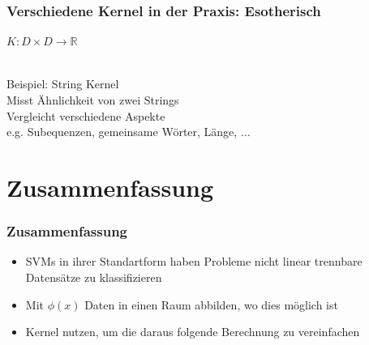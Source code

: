 	\begin{frame}
		\frametitle{Verschiedene Kernel in der Praxis: Esotherisch}
			$K: D \times D \rightarrow \mathbb{R}$ \\\
			
			Beispiel: String Kernel \\
			\hspace{31pt} Misst Ähnlichkeit von zwei Strings \\
			\hspace{31pt} Vergleicht verschiedene Aspekte \\
			\hspace{62pt} e.g. Subequenzen, gemeinsame Wörter, Länge, $\dots$
	\end{frame}
	
\section{Zusammenfassung}
	\begin{frame}
		\frametitle{Zusammenfassung}
			\begin{itemize}
				\item SVMs in ihrer Standartform haben Probleme nicht linear trennbare Datensätze zu klassifizieren
				\item Mit $\phi(x)$ Daten in einen Raum abbilden, wo dies möglich ist
				\item Kernel nutzen, um die daraus folgende Berechnung zu vereinfachen
			\end{itemize}
	\end{frame}
